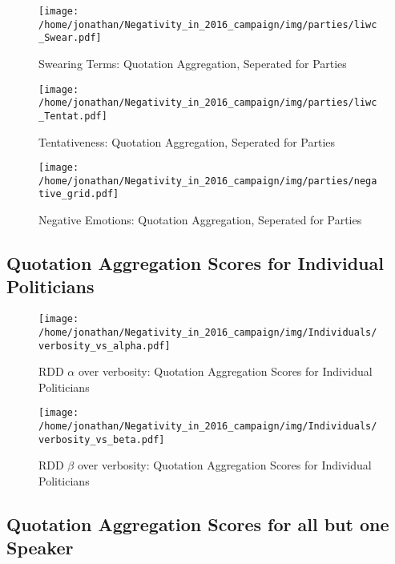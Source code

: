 \begin{figure}[h]\centering
	\texttt{[image: /home/jonathan/Negativity\_in\_2016\_campaign/img/parties/liwc\_Swear.pdf]}
	\caption{Swearing Terms: Quotation Aggregation, Seperated for Parties}
	\label{fig: parties_Swearing Terms}
\end{figure}

\begin{figure}[h]\centering
	\texttt{[image: /home/jonathan/Negativity\_in\_2016\_campaign/img/parties/liwc\_Tentat.pdf]}
	\caption{Tentativeness: Quotation Aggregation, Seperated for Parties}
	\label{fig: parties_Tentativeness}
\end{figure}

\begin{figure}[h]\centering
	\texttt{[image: /home/jonathan/Negativity\_in\_2016\_campaign/img/parties/negative\_grid.pdf]}
	\caption{Negative Emotions: Quotation Aggregation, Seperated for Parties}
	\label{fig: parties_Negative Emotions}
\end{figure}

\clearpage
\pagebreak

\subsection{Quotation Aggregation Scores for Individual Politicians}

\begin{figure}[h]\centering
	\texttt{[image: /home/jonathan/Negativity\_in\_2016\_campaign/img/Individuals/verbosity\_vs\_alpha.pdf]}
	\caption{RDD $\alpha$ over verbosity: Quotation Aggregation Scores for Individual Politicians}
	\label{fig: individuals_RDD alpha over verbosity}
\end{figure}

\begin{figure}[h]\centering
	\texttt{[image: /home/jonathan/Negativity\_in\_2016\_campaign/img/Individuals/verbosity\_vs\_beta.pdf]}
	\caption{RDD $\beta$ over verbosity: Quotation Aggregation Scores for Individual Politicians}
	\label{fig: individuals_RDD beta over verbosity}
\end{figure}

\clearpage
\pagebreak

\subsection{Quotation Aggregation Scores for all but one Speaker}

